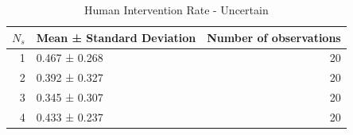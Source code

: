 \begin{table}
\caption{Human Intervention Rate - Uncertain}
\label{tab:human_intervention_rate_uncertain}
\begin{tabular}{rlr}
\toprule
$N_s$ & Mean ± Standard Deviation & Number of observations \\
\midrule
1 & 0.467 ± 0.268 & 20 \\
2 & 0.392 ± 0.327 & 20 \\
3 & 0.345 ± 0.307 & 20 \\
4 & 0.433 ± 0.237 & 20 \\
\bottomrule
\end{tabular}
\end{table}
